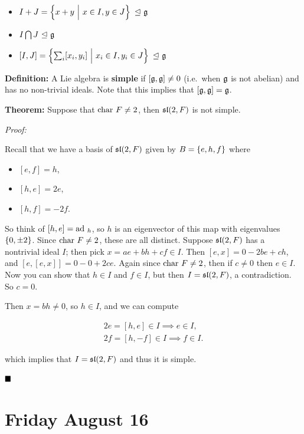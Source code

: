 \begin{itemize}
\tightlist
\item
  \(I+J = \left\{{x+y{~\mathrel{\Big|}~} x\in I, y\in J}\right\} {~\trianglelefteq~} {\mathfrak{g}}\)
\item
  \(I \bigcap J {~\trianglelefteq~} {\mathfrak{g}}\)
\item
  \([I, J] = \left\{{\sum_i [x_i, y_i] {~\mathrel{\Big|}~} x_i \in I, y_i \in J}\right\} {~\trianglelefteq~} {\mathfrak{g}}\)
\end{itemize}

\textbf{Definition:} A Lie algebra is \textbf{simple} if
\([{\mathfrak{g}}, {\mathfrak{g}}] \neq 0\) (i.e.~when \({\mathfrak{g}}\) is not abelian) and has
no non-trivial ideals. Note that this implies that
\([{\mathfrak{g}}, {\mathfrak{g}}] = {\mathfrak{g}}\).

\textbf{Theorem:} Suppose that \(\mathrm{char}~ F \neq 2\), then \({\mathfrak{sl}}(2, F)\)
is not simple.

\emph{Proof:}

Recall that we have a basis of \({\mathfrak{sl}}(2, F)\) given by
\(B = \left\{{e, h, f}\right\}\) where

\begin{itemize}
\tightlist
\item
  \([e, f] = h\),
\item
  \([h, e] = 2e\),
\item
  \([h, f] = -2f\).
\end{itemize}

So think of \([h, e] = \mathrm{ad}~_h\), so \(h\) is an eigenvector of this map
with eigenvalues \(\left\{{0, \pm 2}\right\}\). Since \(\mathrm{char}~ F \neq 2\), these
are all distinct. Suppose \({\mathfrak{sl}}(2, F)\) has a nontrivial ideal \(I\);
then pick \(x = ae + bh + cf \in I\). Then \([e, x] = 0 - 2be + ch\),
and \([e, [e,x]] = 0 - 0 + 2ce\). Again since \(\mathrm{char}~ F \neq 2\), then if
\(c\neq 0\) then \(e\in I\). Now you can show that \(h\in I\) and
\(f\in I\), but then \(I = {\mathfrak{sl}}(2, F)\), a contradiction. So \(c=0\).

Then \(x = bh \neq 0\), so \(h\in I\), and we can compute

\begin{align*}
2e = [h, e] \in I \implies e \in I, \\
2f = [h, -f] \in I \implies f \in I
.\end{align*}

which implies that \(I = {\mathfrak{sl}}(2, F)\) and thus it is simple.

\(\qed\)

\hypertarget{friday-august-16}{%
\section{Friday August 16}\label{friday-august-16}}

